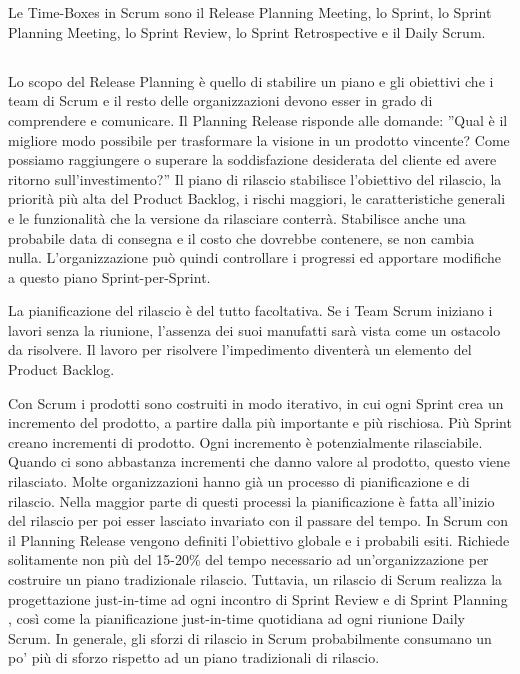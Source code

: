 \section*{\color{Blue}{TIME-BOXES}}
\label{sec:timeboxes}
Le Time-Boxes in Scrum sono il Release Planning Meeting, lo Sprint, lo Sprint Planning Meeting, lo Sprint Review, lo Sprint Retrospective e il Daily Scrum.

\subsection*{\color{Blue}{RELEASE PLANNING MEETING}}
\label{sec:releaseplanningmeeting}
Lo scopo del Release Planning \`e quello di stabilire un piano e gli obiettivi che i team di Scrum e il resto delle organizzazioni  devono esser in grado di comprendere e comunicare. Il Planning Release risponde alle domande: ''Qual \`e il migliore modo possibile per trasformare la visione in un prodotto vincente? Come possiamo raggiungere o superare la soddisfazione desiderata del cliente ed avere  ritorno sull'investimento?'' Il piano di rilascio stabilisce l'obiettivo del rilascio, la priorit\`a pi\`u alta del Product Backlog, i rischi maggiori, le caratteristiche generali e le funzionalit\`a che la versione da rilasciare conterr\`a. Stabilisce anche una probabile data di consegna e il costo che dovrebbe contenere, se non cambia nulla. L'organizzazione pu\`o quindi controllare i progressi ed apportare modifiche a questo piano Sprint-per-Sprint.
\newline

La pianificazione del rilascio \`e del tutto facoltativa. Se i Team Scrum iniziano i lavori senza la riunione, l'assenza dei suoi manufatti sar\`a vista come un ostacolo da risolvere. Il lavoro per risolvere l'impedimento diventer\`a un elemento del Product Backlog.
\newline

Con Scrum i prodotti sono costruiti in modo iterativo, in cui ogni Sprint crea un incremento del prodotto, a partire dalla pi\`u importante e pi\`u rischiosa. Pi\`u Sprint creano incrementi di prodotto. Ogni incremento \`e potenzialmente rilasciabile. Quando ci sono abbastanza incrementi che danno valore al prodotto, questo viene rilasciato.
Molte organizzazioni hanno gi\`a un processo di pianificazione e di rilascio. Nella maggior parte di questi processi la pianificazione \`e fatta all'inizio del rilascio per poi esser lasciato invariato con il passare del tempo. In Scrum con il Planning Release vengono definiti l'obiettivo globale e i probabili esiti. Richiede solitamente non pi\`u del 15-20\% del tempo necessario ad un'organizzazione per costruire un piano tradizionale rilascio. Tuttavia, un rilascio di Scrum realizza la progettazione just-in-time ad ogni incontro di Sprint Review e di Sprint Planning , cos\`i come la pianificazione just-in-time quotidiana ad ogni riunione Daily Scrum. In generale, gli sforzi di rilascio in Scrum probabilmente consumano un po' pi\`u di sforzo rispetto ad un piano tradizionali di rilascio.
\newline

